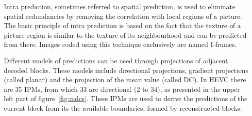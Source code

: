 \documentclass[11pt,a4paper,openright,twoside]{book}
\numberwithin{equation}{section} %
\numberwithin{figure}{section} %
\numberwithin{table}{section} %
\begin{document}
Intra prediction, sometimes referred to spatial prediction, is used to
eliminate spatial redundancies by removing the correlation with local regions
of a picture.
The basic principle of intra prediction is based on the fact that the texture
of a picture region is similar to the texture of its neighbourhood and can be
predicted from there.
Images coded using this technique exclusively are named I-frames.

Different models of predictions can be used through projections of adjacent
decoded blocks.
These models include directional projections, gradient projections (called
planar) and the projection of the mean value (called DC).
In \ac{HEVC} there are 35 \acfp{IPM}, from which 33 are directional (2 to 34),
as presented in the upper left part of figure~\ref{fig:mdcs}.
These \acp{IPM} are used to derive the predictions of the current block from
its the available boundaries, formed by reconstructed blocks.
\end{document}
